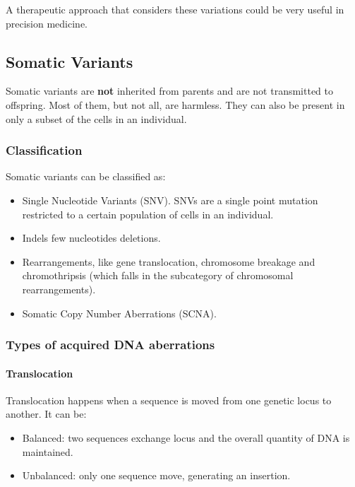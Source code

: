 		A therapeutic approach that considers these variations could be very useful in precision medicine.

	\subsection{Somatic Variants}
	Somatic variants are \textbf{not} inherited from parents and are not transmitted to offspring.
	Most of them, but not all, are harmless.
	They can also be present in only a subset of the cells in an individual.

		\subsubsection{Classification}
		Somatic variants can be classified as:

		\begin{multicols}{2}
			\begin{itemize}
				\item Single Nucleotide Variants (SNV).
					SNVs are a single point mutation restricted to a certain population of cells in an individual.
				\item Indels few nucleotides deletions.
				\item Rearrangements, like gene translocation, chromosome breakage and chromothripsis (which falls in the subcategory of chromosomal rearrangements).
				\item Somatic Copy Number Aberrations (SCNA).
			\end{itemize}
		\end{multicols}


		\subsubsection{Types of acquired DNA aberrations}

			\paragraph{Translocation}
			Translocation happens when a sequence is moved from one genetic locus to another.
			It can be:

			\begin{multicols}{2}
				\begin{itemize}
					\item Balanced: two sequences exchange locus and the overall quantity of DNA is maintained.
					\item Unbalanced: only one sequence move, generating an insertion.
				\end{itemize}
			\end{multicols}

